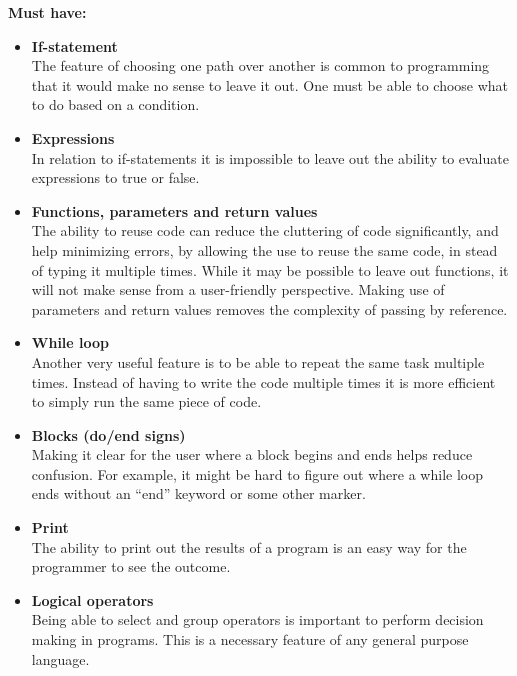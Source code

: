 \textbf{Must have:}
\begin{itemize}
\item \textbf{If-statement} \\
The feature of choosing one path over another is common to programming that it would make no sense to leave it out. One must be able to choose what to do based on a condition. \\

\item \textbf{Expressions} \\
In relation to if-statements it is impossible to leave out the ability to evaluate expressions to true or false. \\

\item \textbf{Functions, parameters and return values} \\
The ability to reuse code can reduce the cluttering of code significantly, and help minimizing errors, by allowing the use to reuse the same code, in stead of typing it
multiple times. While it may be possible to leave out functions, it will not make sense from a user-friendly perspective. Making use of parameters and return values removes the complexity of passing by reference. \\

\item \textbf{While loop} \\
Another very useful feature is to be able to repeat the same task multiple times. Instead of having to write the code multiple times it is more efficient to simply run the same piece of code. \\

\item \textbf{Blocks (do/end signs)} \\
Making it clear for the user where a block begins and ends helps reduce confusion. For example, it might be hard to figure out where a while loop ends without an ``end'' keyword or some other marker. \\

\item \textbf{Print} \\
The ability to print out the results of a program is an easy way for the programmer to see the outcome. \\

\item \textbf{Logical operators} \\
Being able to select and group operators is important to perform decision making in programs. This is a necessary feature of any general purpose language.\\


\end{itemize}
